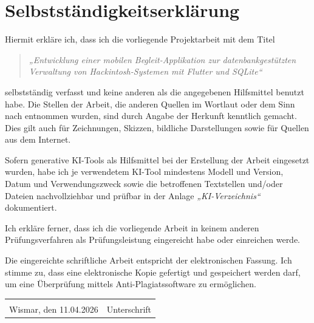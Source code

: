 \section*{Selbstständigkeitserklärung}

Hiermit erkläre ich, dass ich die vorliegende Projektarbeit mit dem Titel

\begin{quote}
\textit{„Entwicklung einer mobilen Begleit-Applikation zur datenbankgestützten Verwaltung von Hackintosh-Systemen mit Flutter und SQLite“}
\end{quote}

selbstständig verfasst und keine anderen als die angegebenen Hilfsmittel benutzt habe. Die Stellen der Arbeit, die anderen Quellen im Wortlaut oder dem Sinn nach entnommen wurden, sind durch Angabe der Herkunft kenntlich gemacht. Dies gilt auch für Zeichnungen, Skizzen, bildliche Darstellungen sowie für Quellen aus dem Internet.

Sofern generative KI-Tools als Hilfsmittel bei der Erstellung der Arbeit eingesetzt wurden, habe ich je verwendetem KI-Tool mindestens Modell und Version, Datum und Verwendungszweck sowie die betroffenen Textstellen und/oder Dateien nachvollziehbar und prüfbar in der Anlage \textit{„KI-Verzeichnis“} dokumentiert.

Ich erkläre ferner, dass ich die vorliegende Arbeit in keinem anderen Prüfungsverfahren als Prüfungsleistung eingereicht habe oder einreichen werde.

Die eingereichte schriftliche Arbeit entspricht der elektronischen Fassung. Ich stimme zu, dass eine elektronische Kopie gefertigt und gespeichert werden darf, um eine Überprüfung mittels Anti-Plagiatssoftware zu ermöglichen.

\vspace{2cm}

\begin{tabular}{p{7cm}p{7cm}}
\hrulefill & \hrulefill \\
Wismar, den 11.04.2026 & Unterschrift
\end{tabular}